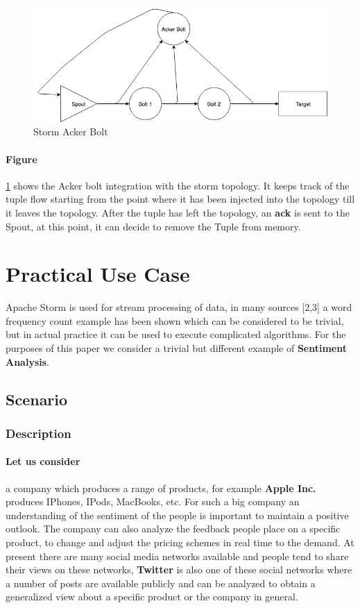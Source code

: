\documentclass[runningheads,a4paper]{llncs}[2015/06/24]
\begin{document}
\begin{figure}
  \begin{center}
    \includegraphics[width=.7\textwidth]{acker.png}
    \caption{Storm Acker Bolt \cite{stormtwitter}}
    \label{fig:acker}
   \end{center}
\end{figure}

\paragraph{Figure} \ref{fig:acker} shows the Acker bolt integration with the storm topology. It keeps track of the tuple flow starting from the point where it has been injected into the topology till it leaves the topology. After the tuple has left the topology, an \textbf{ack} is sent to the Spout, at this point, it can decide to remove the Tuple from memory.

\section{Practical Use Case}
\label{sec:usecase}
Apache Storm is used for stream processing of data, in many sources [2,3] a word frequency count example has been shown which can be considered to be trivial, but in actual practice it can be used to execute complicated algorithms. For the purposes of this paper we consider a trivial but different example of \textbf{Sentiment Analysis}.

\subsection{Scenario}

\subsubsection{Description}
\paragraph{Let us consider} a company which produces a range of products, for example \textbf{Apple Inc.} produces IPhones, IPods, MacBooks, etc. For such a big company an understanding of the sentiment of the people is important to maintain a positive outlook. The company can also analyze the feedback people place on a specific product, to change and adjust the pricing schemes in real time to the demand.  At present there are many social media networks available and people tend to share their views on these networks,  \textbf{Twitter} is also one of these social networks where a number of posts are available publicly and can be analyzed to obtain a generalized view about a specific product or the company in general.
\end{document}
